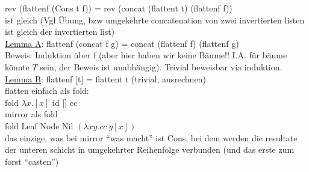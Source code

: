 \documentclass{article}
\theoremstyle{definition}
\begin{document}
	rev (flattenf (Cons t f)) = rev (concat (flattent t) (flattenf f))\\
	ist gleich (Vgl Übung, bzw umgekehrte concatenation von zwei invertierten listen ist gleich der invertierten list)\\
	\underline{Lemma A}: flattenf (concat f g) = concat (flattenf f) (flattenf g)\\
	Beweis: Induktion über f (aber hier haben wir keine Bäume!! I.A. für bäume könnte $T$ sein, der Beweis ist unabhängig). Trivial beweisbar via induktion.\\
	\underline{Lemma B}: flattenf [t] = flattent t (trivial, ausrechnen)\\
	flatten einfach als fold:\\
	fold $\lambda x.[x]$ id [] cc\\
	mirror als fold\\
	fold Leaf Node Nil $(\lambda x y.cc\ y [x])$\\
	das einzige, was bei mirror ``was macht'' ist Cons, bei dem werden die resultate der unteren schicht in umgekehrter Reihenfolge verbunden (und das erste zum forst ``casten'')
\end{document}
